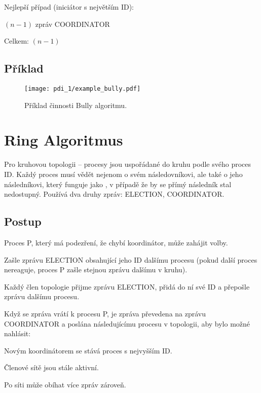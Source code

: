 \noindent Nejlepší případ (iniciátor s největším ID):

\begin{compactitem}
    \item $(n-1)$ zpráv COORDINATOR
    \item Celkem: $(n-1)$
\end{compactitem}

\subsection*{Příklad}

\begin{figure}[H]
    \centering
    \texttt{[image: pdi\_1/example\_bully.pdf]}
    \caption{Příklad činnosti Bully algoritmu.}
\end{figure}


\section{Ring Algoritmus}

Pro kruhovou topologii -- procesy jsou uspořádané do kruhu podle svého proces ID.
Každý proces musí vědět nejenom o svém následovníkovi, ale také o jeho následníkovi, který funguje jako , v případě že by se přímý následník stal nedostupný. Používá dva druhy zpráv: ELECTION, COORDINATOR.

\subsection*{Postup}

\begin{compactitem}
    \item Proces P, který má podezření, že chybí koordinátor, může zahájit volby.
    \begin{compactenum}
        \item Zašle zprávu ELECTION obsahující jeho ID dalšímu procesu (pokud další proces nereaguje, proces P zašle stejnou zprávu dalšímu v kruhu).
        \item Každý člen topologie přijme zprávu ELECTION, přidá do ní své ID a přepošle zprávu dalšímu procesu.
    \end{compactenum}
    \item Když se zpráva vrátí k procesu P, je zpráva převedena na zprávu  COORDINATOR a poslána následujícímu procesu v topologii, aby bylo možné nahlásit:
    \begin{compactenum}
        \item Novým koordinátorem se stává proces s nejvyšším ID.
        \item Členové sítě jsou stále aktivní.
    \end{compactenum}
    \item Po síti může obíhat více zpráv zároveň.
\end{compactitem}

